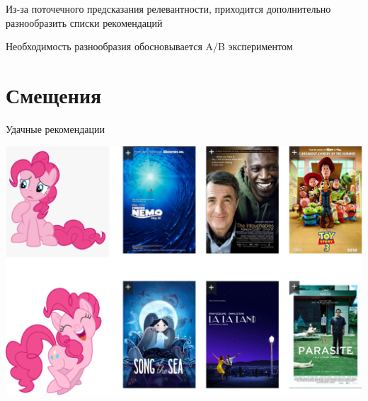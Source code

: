 \documentclass[11pt,aspectratio=169,handout]{beamer}
\begin{document}
\begin{frame}{}

\begin{tcolorbox}[colback=info!5,colframe=info!80,title=]
Из-за поточечного предсказания релевантности, приходится дополнительно разнообразить списки рекомендаций
\end{tcolorbox}

\begin{tcolorbox}[colback=info!5,colframe=info!80,title=]
Необходимость разнообразия обосновывается A/B экспериментом
\end{tcolorbox}

\end{frame}

\section{Смещения}

\begin{frame}{Удачные рекомендации}

\begin{center}
\includegraphics[scale=0.22]{images/serendipity-pony.png}
\end{center}

\end{frame}
\end{document}
